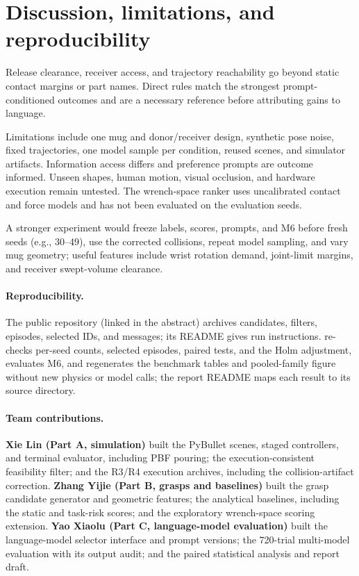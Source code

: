 \documentclass{article}
\begin{document}
\section{Discussion, limitations, and reproducibility}
\label{sec:discussion}
Release clearance, receiver access, and trajectory reachability go beyond static contact margins or part names. Direct rules match the strongest prompt-conditioned outcomes and are a necessary reference before attributing gains to language.

Limitations include one mug and donor/receiver design, synthetic pose noise, fixed trajectories, one model sample per condition, reused scenes, and simulator artifacts. Information access differs and preference prompts are outcome informed. Unseen shapes, human motion, visual occlusion, and hardware execution remain untested. The wrench-space ranker uses uncalibrated contact and force models and has not been evaluated on the evaluation seeds.

A stronger experiment would freeze labels, scores, prompts, and M6 before fresh seeds (e.g., 30--49), use the corrected collisions, repeat model sampling, and vary mug geometry; useful features include wrist rotation demand, joint-limit margins, and receiver swept-volume clearance.

\paragraph{Reproducibility.}
The public repository (linked in the abstract) archives candidates, filters, episodes, selected IDs, and messages; its README gives run instructions.  re-checks per-seed counts, selected episodes, paired tests, and the Holm adjustment, evaluates M6, and regenerates the benchmark tables and pooled-family figure without new physics or model calls; the report README maps each result to its source directory.

\paragraph{Team contributions.}
\textbf{Xie Lin (Part A, simulation)} built the PyBullet scenes, staged controllers, and terminal evaluator, including PBF pouring; the execution-consistent feasibility filter; and the R3/R4 execution archives, including the collision-artifact correction. \textbf{Zhang Yijie (Part B, grasps and baselines)} built the grasp candidate generator and geometric features; the analytical baselines, including the static and task-risk scores; and the exploratory wrench-space scoring extension. \textbf{Yao Xiaolu (Part C, language-model evaluation)} built the language-model selector interface and prompt versions; the 720-trial multi-model evaluation with its output audit; and the paired statistical analysis and report draft.
\end{document}
